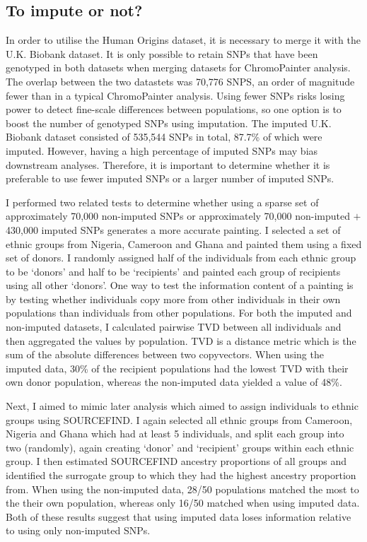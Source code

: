 \subsection{To impute or not?}

In order to utilise the Human Origins dataset, it is necessary to merge it with the U.K. Biobank dataset. It is only possible to retain SNPs that have been genotyped in both datasets when merging datasets for ChromoPainter analysis. The overlap between the two datastets was 70,776 SNPS, an order of magnitude fewer than in a typical ChromoPainter analysis. Using fewer SNPs risks losing power to detect fine-scale differences between populations, so one option is to boost the number of genotyped SNPs using imputation. The imputed U.K. Biobank dataset consisted of 535,544 SNPs in total, 87.7\% of which were imputed. However, having a high percentage of imputed SNPs may bias downstream analyses. Therefore, it is important to determine whether it is preferable to use fewer imputed SNPs or a larger number of imputed SNPs.

I performed two related tests to determine whether using a sparse set of approximately 70,000 non-imputed SNPs or approximately 70,000 non-imputed $+$ 430,000 imputed SNPs generates a more accurate painting. I selected a set of ethnic groups from Nigeria, Cameroon and Ghana and painted them using a fixed set of donors. I randomly assigned half of the individuals from each ethnic group to be `donors' and half to be `recipients' and painted each group of recipients using all other `donors'. One way to test the information content of a painting is by testing whether individuals copy more from other individuals in their own populations than individuals from other populations. For both the imputed and non-imputed datasets, I calculated pairwise TVD between all individuals and then aggregated the values by population. TVD is a distance metric which is the sum of the absolute differences between two copyvectors. When using the imputed data, 30\% of the recipient populations had the lowest TVD with their own donor population, whereas the non-imputed data yielded a value of 48\%. 

Next, I aimed to mimic later analysis which aimed to assign individuals to ethnic groups using SOURCEFIND. I again selected all ethnic groups from Cameroon, Nigeria and Ghana which had at least 5 individuals, and split each group into two (randomly), again creating `donor' and `recipient' groups within each ethnic group. I then estimated SOURCEFIND ancestry proportions of all groups and identified the surrogate group to which they had the highest ancestry proportion from. When using the non-imputed data, 28/50 populations matched the most to the their own population, whereas only 16/50 matched when using imputed data. Both of these results suggest that using imputed data loses information relative to using only non-imputed SNPs.

